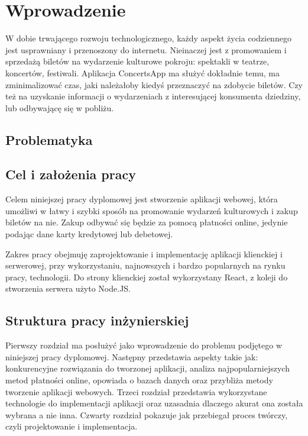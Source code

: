 \documentclass[12pt]{article}
\begin{document}
\begin{sloppypar}


\tableofcontents
\newpage

\section{Wprowadzenie}
{
  W dobie trwającego rozwoju technologicznego, każdy aspekt życia codziennego jest usprawniany i przenoszony
  do internetu. Nieinaczej jest z promowaniem i sprzedażą biletów na wydarzenie kulturowe pokroju:
  spektakli w teatrze, koncertów, festiwali. Aplikacja ConcertsApp ma służyć dokładnie temu,
  ma zminimalizować czas, jaki należałoby kiedyś przeznaczyć na zdobycie biletów. Czy też na uzyskanie
  informacji o wydarzeniach z interesującej konsumenta dziedziny, lub odbywającę się w pobliżu.
\subsection{Problematyka}
{
  
}
\subsection{Cel i założenia pracy}
{
  Celem niniejszej pracy dyplomowej jest stworzenie aplikacji webowej, która umożliwi w łatwy i szybki
  sposób na promowanie wydarzeń kulturowych i zakup biletów na nie. Zakup odbywać się będzie za pomocą
  płatności online, jedynie podając dane karty kredytowej lub debetowej.\par
  Zakres pracy obejmuję zaprojektowanie i implementację aplikacji klienckiej i serwerowej, przy
  wykorzystaniu, najnowszych i bardzo popularnych na rynku pracy, technologii. Do strony klienckiej
  został wykorzystany React, z koleji do stworzenia serwera użyto Node.JS.
}
\subsection{Struktura pracy inżynierskiej}
{
  Pierwszy rozdział ma posłużyć jako wprowadzenie do problemu podjętego w niniejszej pracy dyplomowej.
  Następny przedstawia aspekty takie jak: konkurencyjne rozwiązania do tworzonej aplikacji,
  analiza najpopularniejszych metod płatności online, opowiada o bazach danych oraz przybliża
  metody tworzenie aplikacji webowych.
  Trzeci rozdział przedstawia wykorzystane technologie do implementacji aplikacji oraz uzasadnia dlaczego
  akurat ona została wybrana a nie inna.
  Czwarty rozdział pokazuje jak przebiegał proces twórczy, czyli projektowanie i implementacja.
}
}


\end{sloppypar}
\end{document}
